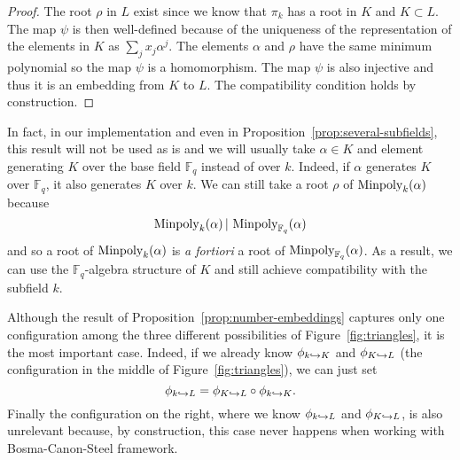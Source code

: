   \begin{proof}
    The root $\rho$ in $L$ exist since we know that $\pi_k$ has a root in $K$
    and $K\subset L$. The map $\psi$ is then well-defined because of the uniqueness of the
    representation of the elements in $K$ as $\sum_jx_j\alpha^j$. The elements
    $\alpha$ and $\rho$ have the same minimum polynomial so the map $\psi$ is a
    homomorphism. The map $\psi$ is also injective and thus it is an embedding
    from $K$ to $L$. The compatibility condition holds by construction.
  \end{proof}
  \begin{rem}
    \label{rem:base-field}
   In fact, in our implementation and even in
   Proposition~\ref{prop:several-subfields}, this result will not be used as is and
   we will usually take $\alpha\in K$ and element generating $K$ over the base
   field $\mathbb{F}_q$ instead of over $k$. Indeed, if $\alpha$ generates $K$
   over $\mathbb{F}_q$, it also generates $K$ over $k$. We can still take a root
   $\rho$ of $\operatorname{Minpoly}_{k}(\alpha)$ because
   \[
     \operatorname{Minpoly}_k(\alpha)\,|\,\operatorname{Minpoly}_{\mathbb{F}_q}(\alpha)
   \]
   and so a root of $\operatorname{Minpoly}_{k}(\alpha)$ is \emph{a fortiori} a root of
   $\operatorname{Minpoly}_{\mathbb{F}_q}(\alpha)$. As a result, we can use the
   $\mathbb{F}_q$-algebra structure of $K$ and still achieve compatibility with
   the subfield $k$.
  \end{rem}
  Although the result of Proposition~\ref{prop:number-embeddings} captures only
  one configuration among the three different possibilities of
  Figure~\ref{fig:triangles}, it is the most important case. Indeed, if we
  already know $\phi_{k\hookrightarrow K}$ and $\phi_{K\hookrightarrow L}$ (the configuration in the
  middle of Figure~\ref{fig:triangles}), we can just set
  \[
    \phi_{k\hookrightarrow L} = \phi_{K\hookrightarrow L}\circ\phi_{k\hookrightarrow K}.
  \]
  Finally the configuration on the right, where we know $\phi_{k\hookrightarrow L}$ and
  $\phi_{K\hookrightarrow L}$, is also unrelevant because, by construction, this case never
  happens when working with Bosma-Canon-Steel framework.
